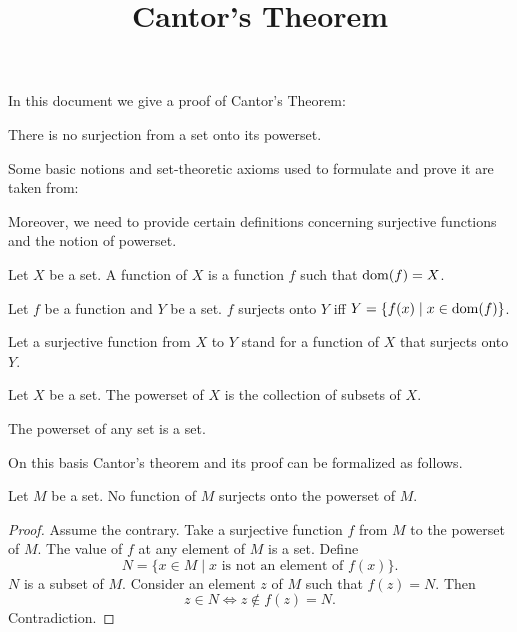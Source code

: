 \documentclass{article}
\title{Cantor's Theorem}
\author{}
\date{}
\begin{document}

  \maketitle

  In this document we give a proof of Cantor's Theorem:

  \begin{theorem*}
    There is no surjection from a set onto its powerset.
  \end{theorem*}

  Some basic notions and set-theoretic axioms used to formulate and prove it are
  taken from:

  \begin{forthel}
  \end{forthel}

  Moreover, we need to provide certain definitions concerning surjective
  functions and the notion of powerset.

  \begin{forthel}
    \begin{definition*}
      Let $X$ be a set.
      A function of $X$ is a function $f$ such that $\operatorname{dom}(f) = X$.
    \end{definition*}

    \begin{definition*}
      Let $f$ be a function and $Y$ be a set.
      $f$ surjects onto $Y$ iff $Y = \{f(x) \mid x \in \operatorname{dom}(f)\}$.
    \end{definition*}

    Let a surjective function from $X$ to $Y$ stand for a function of $X$ that
    surjects onto $Y$.

    \begin{definition*}
      Let $X$ be a set.
      The powerset of $X$ is the collection of subsets of $X$.
    \end{definition*}

    \begin{axiom*}
      The powerset of any set is a set.
    \end{axiom*}
  \end{forthel}

  On this basis Cantor's theorem and its proof can be formalized as follows.

  \begin{forthel}
    \begin{theorem*}[Cantor]
      Let $M$ be a set.
      No function of $M$ surjects onto the powerset of $M$.
    \end{theorem*}
    \begin{proof}
      Assume the contrary.
      Take a surjective function $f$ from $M$ to the powerset of $M$.
      The value of $f$ at any element of $M$ is a set.
      Define \[ N = \{x \in M \mid \text{$x$ is not an element of $f(x)$}\}. \]
      $N$ is a subset of $M$.
      Consider an element $z$ of $M$ such that $f(z) = N$.
      Then \[ z \in N \iff z \notin f(z) = N. \]
      Contradiction.
    \end{proof}
  \end{forthel}
\end{document}
